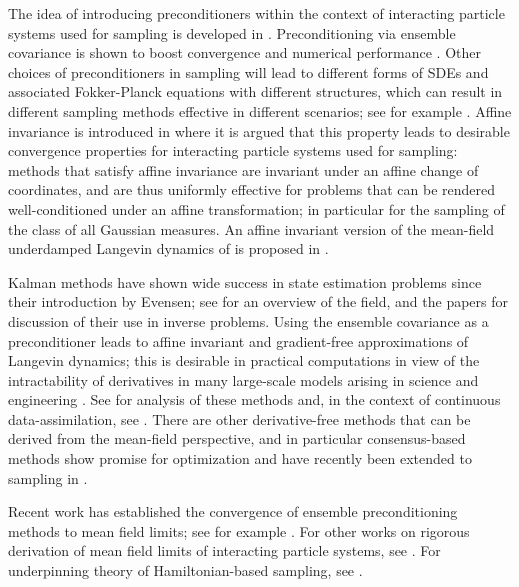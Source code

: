 \documentclass[12pt]{caltech_thesis}
\numberwithin{equation}{section}
\begin{document}
{The idea of introducing preconditioners within the context of interacting particle systems used for sampling is developed in  \cite{leimkuhler2018ensemble}.} Preconditioning via ensemble covariance {is} shown to boost convergence and numerical performance \cite{garbuno2020interacting}. Other choices of preconditioners in sampling will lead to different forms of SDEs and associated Fokker-Planck equations with different structures, which can result in different sampling methods effective in different scenarios; see for example \cite{lindsey2021ensemble}.
Affine invariance is introduced in \cite{goodman2010ensemble} where it is argued that
this property leads to desirable convergence properties for interacting
particle systems used for sampling: methods that satisfy affine invariance are invariant under an affine change of coordinates, and are thus uniformly effective for problems that can be rendered  well-conditioned under an affine 
transformation; {in particular for the sampling of the class of
all Gaussian measures.} An affine invariant version of the mean-field 
underdamped Langevin dynamics of \cite{garbuno2020interacting} 
is proposed in \cite{nusken2019note,garbuno2020affine}.
 
     
     {Kalman methods have shown wide success in state estimation problems since their
     introduction by Evensen; see \cite{evensen2009data} for an overview of the field,
     and the papers \cite{reich2011dynamical,iglesias2013ensemble} for discussion of
     their use in inverse problems. Using the ensemble covariance as a preconditioner  leads to affine invariant \cite{garbuno2020affine} and gradient-free 
     \cite{garbuno2020interacting} approximations of Langevin dynamics; this is desirable in practical computations in view of the intractability of derivatives in many large-scale models arising in science and engineering \cite{cleary2021calibrate,haber2018never,kovachki2019ensemble,huang2021unscented}. 
     See \cite{bergemann2010mollified,schillings2017analysis} for analysis of these methods and, in the context of continuous data-assimilation, see \cite{del2017stability,bergemann2012ensemble,taghvaei2018kalman}. {There are other
     derivative-free methods that can be derived from the mean-field perspective,
     and in particular consensus-based methods show promise for optimization
     \cite{carrillo2018analytical} and have recently been extended to sampling in
     \cite{carrillo2022consensus}.}}
     
     
     Recent work has established the convergence of ensemble preconditioning methods to mean field limits; see for example \cite{ding2021ensemble}. For other works on rigorous derivation of mean field limits of interacting particle systems, see \cite{sznitman1991topics,carrillo2010particle,jabin2017mean}. For underpinning theory of Hamiltonian-based sampling, see
     \cite{bou2017randomized,bou2018geometric,livingstone2019geometric,betancourt2017geometric}.
     
\end{document}
